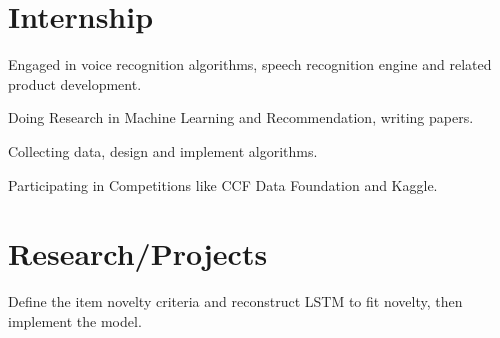 \documentclass[]{deedy-resume-openfont}
\begin{document}
\begin{minipage}[t]{0.69\textwidth} 


\section{Internship}

\vspace{\topsep} %
\begin{tightemize}
\item Engaged in voice recognition algorithms, speech recognition engine and related product development. 
\end{tightemize}

\sectionsep %

\begin{tightemize}
\item Doing Research in Machine Learning and Recommendation, writing papers.
\item Collecting data, design and implement algorithms.
\item Participating in Competitions like CCF Data Foundation and Kaggle.
\end{tightemize}

\sectionsep

\section{Research/Projects}

\begin{tightemize}
\item Define the item novelty criteria and reconstruct LSTM to fit novelty, then implement the model.
\end{tightemize}


\end{minipage}
\end{document}
